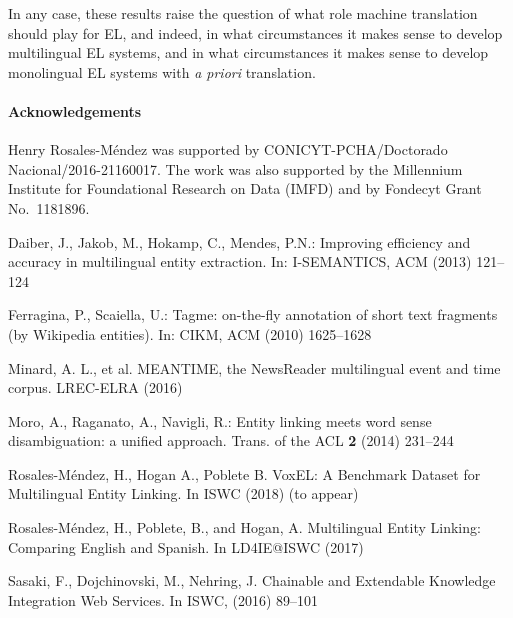 \documentclass{llncs}
\begin{document}
In any case, these results raise the question of what role machine translation should play for EL, and indeed, in what circumstances it makes sense to develop multilingual EL systems, and in what circumstances it makes sense to develop monolingual EL systems with \textit{a priori} translation. 

{\footnotesize
\paragraph{Acknowledgements} Henry Rosales-M\'endez was supported by CONICYT-PCHA/Doc\-torado Nacional/2016-21160017. The work was also supported by the Millennium Institute for Foundational Research on Data (IMFD) and by Fondecyt Grant No.\ 1181896.
}



\begin{thebibliography}{99}

Daiber, J., Jakob, M., Hokamp, C., Mendes, P.N.: Improving efficiency and accuracy in multilingual entity extraction. In: I-SEMANTICS, ACM (2013) 121--124

Ferragina, P., Scaiella, U.: Tagme: on-the-fly annotation of short text fragments (by Wikipedia entities). In: CIKM, ACM (2010) 1625--1628

Minard, A. L., et al. MEANTIME, the NewsReader multilingual event and time corpus. LREC-ELRA (2016)

Moro, A., Raganato, A., Navigli, R.: Entity linking meets word sense disambiguation: a unified approach. Trans. of the ACL \textbf{2} (2014) 231--244

Rosales-Méndez, H., Hogan A., Poblete B. VoxEL: A Benchmark Dataset for Multilingual Entity Linking. In ISWC (2018) (to appear)

Rosales-Méndez, H., Poblete, B., and Hogan, A. Multilingual Entity Linking: Comparing English and Spanish. In LD4IE@ISWC (2017)

Sasaki, F., Dojchinovski, M., Nehring, J. Chainable and Extendable Knowledge Integration Web Services. In ISWC, (2016) 89--101

\end{thebibliography}
\end{document}
